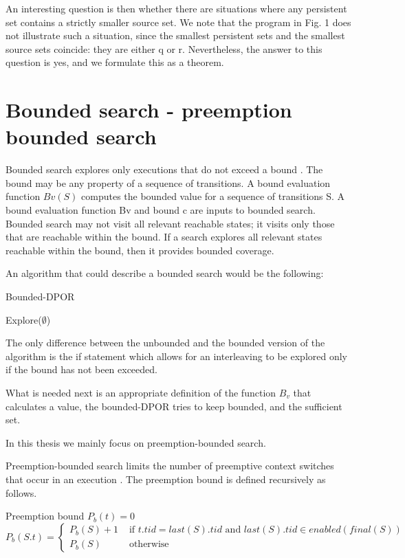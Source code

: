 An interesting question is then whether there are situations where any persistent
set contains a strictly smaller source set. We note that the program in Fig. 1
does not illustrate such a situation, since the smallest persistent sets and the
smallest source sets coincide: they are either {q} or {r}. Nevertheless, the answer
to this question is yes, and we formulate this as a theorem.


\section{Bounded search - preemption bounded search}
Bounded search explores only executions that do not exceed
a bound \cite{BPOR,Thomson}. The bound may be any property of a
sequence of transitions. A bound evaluation function $Bv(S)$
computes the bounded value for a sequence of transitions S.
A bound evaluation function Bv and bound c are inputs to
bounded search. Bounded search may not visit all relevant
reachable states; it visits only those that are reachable within
the bound. If a search explores all relevant states reachable
within the bound, then it provides bounded coverage.

An algorithm that could describe a bounded search would be the following:

\begin{algorithm}[H]
    \caption{Bounded-DPOR}
    Explore($\emptyset$)\;
\end{algorithm}

\noindent The only difference between the unbounded and the bounded version of the algorithm is the if statement which allows for an interleaving to be explored
only if the bound has not been exceeded.

What is needed next is an appropriate definition of the function $B_v$ that calculates a value, the bounded-DPOR tries to keep bounded, 
and the sufficient set. 

In this thesis we mainly focus on preemption-bounded search. 

Preemption-bounded search limits the number of preemptive context switches that occur in an execution \cite{Musu07}. The 
preemption bound is defined recursively as follows.

\begin{definition}{Preemption bound}
$P_b(t) = 0$ \\
$P_b(S.t) = 
 \begin{cases} 
    P_b(S) + 1 & \text{ if } t.tid = last(S).tid \text{ and } last(S).tid \in enabled(final(S)) \\
    P_b(S) & \text{ otherwise }
 \end{cases}
$\\
\end{definition}

